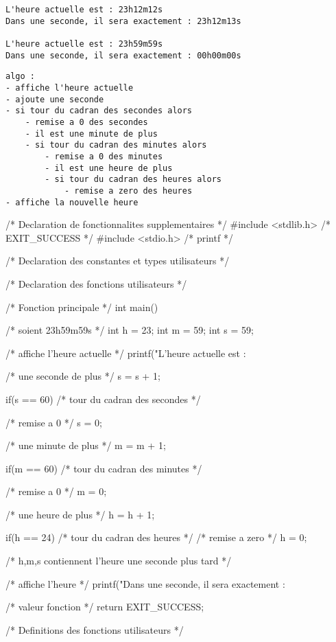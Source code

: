 \begin{verbatim}
L'heure actuelle est : 23h12m12s
Dans une seconde, il sera exactement : 23h12m13s

L'heure actuelle est : 23h59m59s
Dans une seconde, il sera exactement : 00h00m00s
\end{verbatim}

\begin{correction}
\begin{verbatim}
algo :
- affiche l'heure actuelle
- ajoute une seconde
- si tour du cadran des secondes alors
    - remise a 0 des secondes
    - il est une minute de plus
    - si tour du cadran des minutes alors
        - remise a 0 des minutes
        - il est une heure de plus
        - si tour du cadran des heures alors
    	    - remise a zero des heures
- affiche la nouvelle heure
\end{verbatim}
  \begin{listing}{1}
/* Declaration de fonctionnalites supplementaires */
#include <stdlib.h> /* EXIT_SUCCESS */
#include <stdio.h> /* printf */

/* Declaration des constantes et types utilisateurs */

/* Declaration des fonctions utilisateurs */

/* Fonction principale */
int main()
{
    /* soient 23h59m59s */
    int h = 23;
    int m = 59;
    int s = 59;

    /* affiche l'heure actuelle */
    printf("L'heure actuelle est : %

    /* une seconde de plus */
    s = s + 1;

    if(s == 60) /* tour du cadran des secondes */
    {
	/* remise a 0 */
	s = 0;

	/* une minute de plus */
	m = m + 1;

	if(m == 60) /* tour du cadran des minutes */
	{
	    /* remise a 0 */
	    m = 0;

	    /* une heure de plus */
	    h = h + 1;

	    if(h == 24) /* tour du cadran des heures */
	    {
		/* remise a zero */
		h = 0;
	    }
	}
    }
    /* h,m,s contiennent l'heure une seconde plus tard */

    /* affiche l'heure */
    printf("Dans une seconde, il sera exactement : %

    /* valeur fonction */
    return EXIT_SUCCESS;
}

/* Definitions des fonctions utilisateurs */
  \end{listing}
\end{correction}

